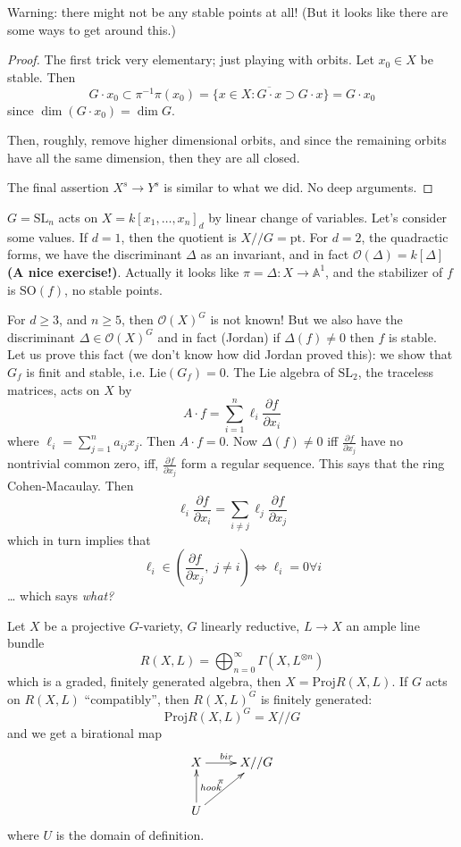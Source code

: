 Warning: there might not be any stable points at all! (But it looks like there
are some ways to get around this.)

\begin{proof}
The first trick very elementary; just playing with orbits. 
Let $x_0 \in X$ be stable. Then
$$
G\cdot x_0 \subset \pi^{-1}\pi(x_0)=\{ x \in X 
: \overline{G\cdot x}\supset G\cdot x\}=G\cdot x_0
$$
since $\dim (G\cdot x_0)=\dim G$.

Then, roughly, remove higher dimensional orbits, and since the remaining orbits
have all the same dimension, then they are all closed.

The final assertion $X^s \to Y^s$ is similar to what we did. No deep arguments.
\end{proof}

\begin{example}
\label{example-action-of-SL2-on-forms}
$G=\text{SL}_n$ acts on $X=k[x_1,\ldots,x_n]_d$ by linear change of variables.
Let's consider some values. If $d=1$, then the quotient is  $X//G=\text{pt}$.
For $d=2$, the quadractic forms, we have the discriminant $\Delta$ as an 
invariant, and in fact $\mathcal{O}(\Delta)=k[\Delta]$ {\bf (A nice exercise!)}. 
Actually it looks like $\pi=\Delta:X \to \mathbb{A}^1$, and the stabilizer of 
$f$ is $\text{SO}(f)$, no stable points.

For $d \geq 3$, and $n \geq 5$, then $\mathcal{O}(X)^G$ is not known! But we
also have the discriminant $\Delta \in \mathcal{O}(X)^G$ and in fact (Jordan) if
$\Delta(f) \neq 0$ then $f$ is stable. Let us prove this fact (we don't know how
did Jordan proved this): we show that $G_f$ is finit and stable, i.e.
$\text{Lie}(G_f)=0$. The Lie algebra of $\text{SL}_2$, the traceless matrices,
acts on $X$ by
$$
A\cdot f= \sum_{i=1}^n \ell_i \frac{\partial f}{\partial x_i}
$$
where $\ell_i = \sum_{j=1}^n a_{ij}x_j$. Then $A\cdot f=0$. Now 
$\Delta(f) \neq 0$ iff $\frac{\partial f}{\partial x_j}$ have no nontrivial
common zero, iff, $\frac{\partial f}{\partial x_j}$ form a regular sequence.
This says that the ring Cohen-Macaulay. Then
$$
\ell_i \frac{\partial f}{\partial x_i}
=\sum_{i \neq  j}\ell_j \frac{\partial f}{\partial x_j}
$$
which in turn implies that
$$
\ell_i \in \left(\frac{\partial f}{\partial x_j}, \; j \neq  i\right)
\iff \ell_i=0 \forall  i
$$
… which says {\it what?}
\end{example}

\medskip\noindent
Let $X$ be a projective $G$-variety, $G$ linearly reductive, $L \to X$ an ample
line bundle
$$
R(X,L)=\bigoplus_{n=0}^{\infty} \Gamma(X,L^{\otimes n})
$$
which is a graded, finitely generated algebra, then $X=\text{Proj}R(X,L)$. If
$G$ acts on $R(X,L)$ ``compatibly'', then $R(X,L)^G$ is finitely generated:
$$
\text{Proj}R(X,L)^G=X//G
$$
and we get a birational map
$$
\xymatrix{
X\ar[r]^{bir}& X//G\\
U\ar[u]_{hook}\ar[ur]^{\pi}
}
$$
where $U$ is the domain of definition.

